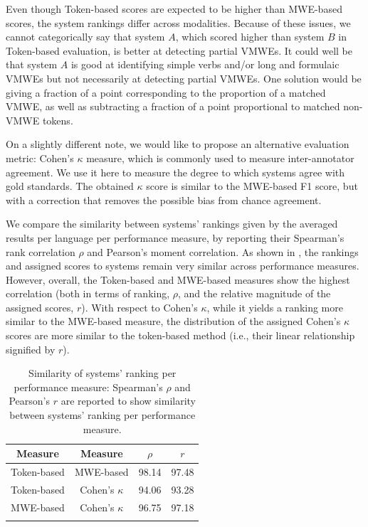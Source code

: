 \documentclass[output=paper
,modfonts
,nonflat,draftmode]{langsci/langscibook}
\begin{document}
Even though Token-based scores are expected to be higher than MWE-based scores, the system rankings differ across modalities. Because of these issues, we cannot categorically say that system $A$, which scored higher than system $B$ in Token-based evaluation, is better at detecting partial VMWEs. It could well be that system $A$ is good at identifying simple verbs and/or long and formulaic VMWEs but not necessarily at detecting partial VMWEs. One solution would be giving a fraction of a point corresponding to the proportion of a matched VMWE, as well as subtracting a fraction of a point proportional to matched non-VMWE tokens. 

On a slightly different note, we would like to propose an alternative evaluation metric: Cohen's $\kappa$ measure, which is commonly used to measure inter-annotator agreement. We use it here to measure the degree to which systems agree with gold standards. The obtained $\kappa$ score is similar to the MWE-based F1 score, but with a correction that removes the possible bias from chance agreement. 

We compare the similarity between systems' rankings given by the averaged results per language per performance measure, by reporting their Spearman's rank correlation $\rho$ and Pearson's moment correlation. As shown in , the rankings and assigned scores to systems remain very similar across performance measures. However, overall, the Token-based and MWE-based measures show the highest correlation (both in terms of ranking, $\rho$, and the relative magnitude of the assigned scores, $r$). With respect to Cohen's $\kappa$, while it yields a ranking more similar to the MWE-based measure, the distribution of the assigned Cohen's $\kappa$ scores are more similar to the token-based method (i.e., their linear relationship signified by $r$).

\begin{table}
\centering
\caption{Similarity of systems' ranking per performance measure: Spearman's $\rho$ and Pearson's $r$ %
are reported to show similarity between systems' ranking per performance measure.}
\label{similarity-of-measures}
\begin{tabular}{cccc}%
\lsptoprule
Measure & Measure & $\rho$ & $r$ \tabularnewline
\midrule
Token-based & MWE-based        & 98.14 & 97.48 \tabularnewline
Token-based & Cohen's $\kappa$ & 94.06 & 93.28 \tabularnewline
MWE-based   & Cohen's $\kappa$ & 96.75 & 97.18 \tabularnewline
\lspbottomrule
\end{tabular}
\end{table}
\end{document}
